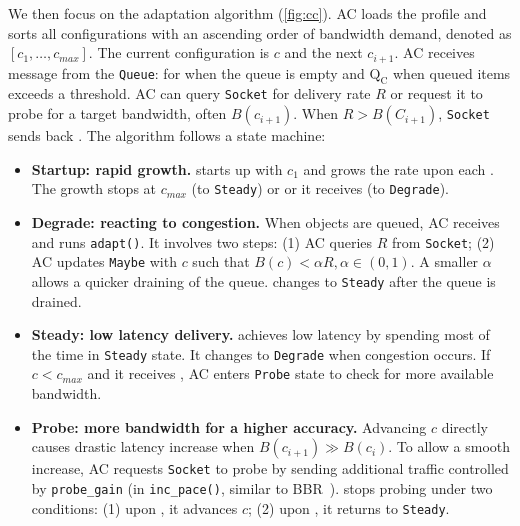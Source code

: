 We then focus on the adaptation algorithm (\autoref{fig:cc}). AC loads the
profile and sorts all configurations with an ascending order of bandwidth
demand, denoted as $[c_1, \dots, c_{max}]$. The current configuration is $c$ and
the next $c_{i+1}$. AC receives message from the \texttt{Queue}: \qe{} for when
the queue is empty and $\text{Q}_\text{C}$ when queued items exceeds a
threshold. AC can query \texttt{Socket} for delivery rate $R$ or request it to
probe for a target bandwidth, often $B(c_{i+1})$. When $R > B(C_{i+1})$,
\texttt{Socket} sends back \spd{}. The algorithm follows a state machine:

\begin{itemize}[leftmargin=*]

\item \textbf{Startup: rapid growth.} \sysname{} starts up with $c_1$ and grows
  the rate upon each \qe{}. The growth stops at $c_{max}$ (to \texttt{Steady})
  or or it receives \qc{} (to \texttt{Degrade}).

\item \textbf{Degrade: reacting to congestion.} When objects are queued, AC
  receives \qc{} and runs \texttt{adapt()}. It involves two steps: (1) AC
  queries $R$ from \texttt{Socket}; (2) AC updates \texttt{Maybe} with $c$ such
  that $B(c) < \alpha R, \alpha \in (0, 1)$. A smaller $\alpha$ allows a quicker
  draining of the queue. \sysname{} changes to \texttt{Steady} after the queue
  is drained.

\item \textbf{Steady: low latency delivery.} \sysname{} achieves low latency by
  spending most of the time in \texttt{Steady} state. It changes to
  \texttt{Degrade} when congestion occurs. If $c < c_{max}$ and it receives
  \qe{}, AC enters \texttt{Probe} state to check for more available bandwidth.

\item \textbf{Probe: more bandwidth for a higher accuracy.} Advancing $c$
  directly causes drastic latency increase when $B(c_{i+1}) \gg B(c_i)$. To
  allow a smooth increase, AC requests \texttt{Socket} to probe by sending
  additional traffic controlled by \texttt{probe\_gain} (in
  \texttt{inc\_pace()}, similar to BBR~\cite{cardwell2017bbr}). \sysname{} stops
  probing under two conditions: (1) upon \spd{}, it advances $c$; (2) upon
  \qc{}, it returns to \texttt{Steady}.

\end{itemize}

